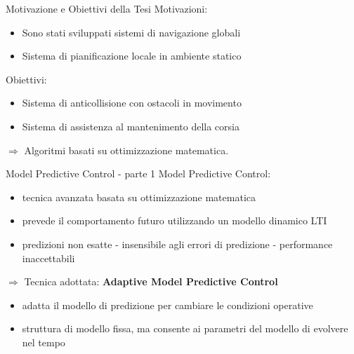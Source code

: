 \documentclass{beamer}
\begin{document}
	\begin{frame}{Motivazione e Obiettivi della Tesi}
	Motivazioni:
		\begin{itemize}
			\item Sono stati sviluppati sistemi di navigazione globali
			\item Sistema di pianificazione locale in ambiente statico
		\end{itemize}
	Obiettivi:
		\begin{itemize}
			\item Sistema di anticollisione con ostacoli in movimento
			\item Sistema di assistenza al mantenimento della corsia
		\end{itemize}
	$\Longrightarrow$ Algoritmi basati su ottimizzazione matematica.
	\end{frame}


	\begin{frame}{Model Predictive Control - parte 1}
		Model Predictive Control:
		\begin{itemize}
			\item tecnica avanzata basata su ottimizzazione matematica
			\item prevede il comportamento futuro utilizzando un modello dinamico LTI
			\item predizioni non esatte - insensibile agli errori di predizione - performance inaccettabili
		\end{itemize}
		$\Longrightarrow$ Tecnica adottata: {\bfseries Adaptive Model Predictive Control}
		\begin{itemize}
			\item adatta il modello di predizione per cambiare le condizioni operative
			\item struttura di modello fissa, ma consente ai parametri del modello di evolvere nel tempo
		\end{itemize}
	\end{frame}
	
\end{document}
